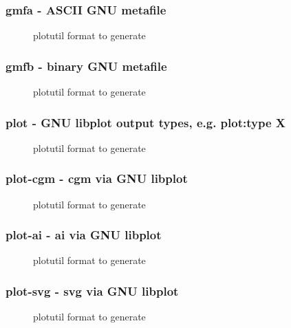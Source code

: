 \documentclass[english,a4paper]{article}
\begin{document}
\subsubsection{gmfa - ASCII GNU metafile }
\begin{description}
\item[] 
plotutil format to generate


\end{description}
\subsubsection{gmfb - binary GNU metafile }
\begin{description}
\item[] 
plotutil format to generate


\end{description}
\subsubsection{plot - GNU libplot output types, e.g. plot:type X}
\begin{description}
\item[] 
plotutil format to generate


\end{description}
\subsubsection{plot-cgm - cgm  via GNU libplot}
\begin{description}
\item[] 
plotutil format to generate


\end{description}
\subsubsection{plot-ai - ai   via GNU libplot}
\begin{description}
\item[] 
plotutil format to generate


\end{description}
\subsubsection{plot-svg - svg  via GNU libplot}
\begin{description}
\item[] 
plotutil format to generate


\end{description}
\end{document}
